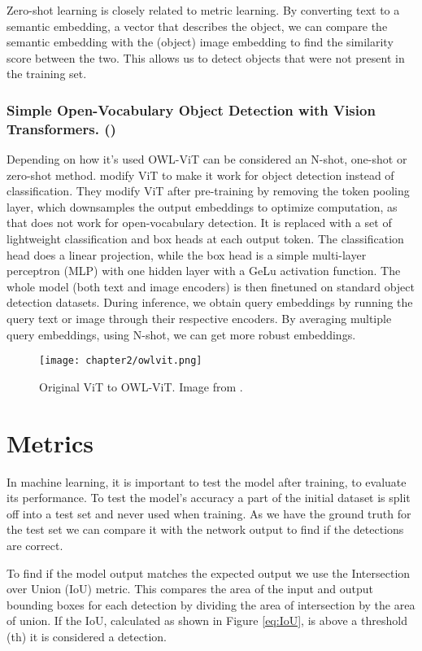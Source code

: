 Zero-shot learning is closely related to metric learning. By converting text to a semantic embedding, a vector that describes the object, we can compare the semantic embedding with the (object) image embedding to find the similarity score between the two. This allows us to detect objects that were not present in the training set. 

\subsubsection*{Simple Open-Vocabulary Object Detection
with Vision Transformers. (\citet{owlvit})} \label{sec:2_owlvit}

Depending on how it's used OWL-ViT can be considered an N-shot, one-shot or zero-shot method. \citet{owlvit} modify ViT to make it work for object detection instead of classification. They modify ViT after pre-training by removing the token pooling layer, which downsamples the output embeddings to optimize computation, as that does not work for open-vocabulary detection. It is replaced with a set of lightweight classification and box heads at each output token. The classification head does a linear projection, while the box head is a simple multi-layer perceptron (MLP) with one hidden layer with a GeLu activation function. The whole model (both text and image encoders) is then finetuned on standard object detection datasets. During inference, we obtain query embeddings by running the query text or image through their respective encoders. By averaging multiple query embeddings, using N-shot, we can get more robust embeddings.

\begin{figure}[h]
	\centering
	\texttt{[image: chapter2/owlvit.png]}
	\caption{\label{fig:2_owl-vitr} Original ViT to OWL-ViT. Image from \citet{owlvit}.}
\end{figure}


\section{Metrics}\label{sec:2_metrics}
In machine learning, it is important to test the model after training, to evaluate its performance. To test the model's accuracy a part of the initial dataset is split off into a test set and never used when training. As we have the ground truth for the test set we can compare it with the network output to find if the detections are correct. 

To find if the model output matches the expected output we use the Intersection over Union (IoU) metric. This compares the area of the input and output bounding boxes for each detection by dividing the area of intersection by the area of union. If the IoU, calculated as shown in Figure \ref{eq:IoU}, is above a threshold (th) it is considered a detection.

